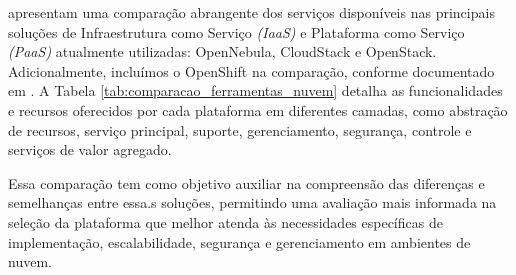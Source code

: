 \cite{vogel2016private} apresentam uma comparação abrangente dos serviços disponíveis nas principais soluções de Infraestrutura como Serviço \textit{(IaaS)} e Plataforma como Serviço \textit{(PaaS)} atualmente utilizadas: OpenNebula, CloudStack e OpenStack. Adicionalmente, incluímos o OpenShift na comparação, conforme documentado em \cite{OpenShiftDocumentation}. A Tabela \ref{tab:comparacao_ferramentas_nuvem} detalha as funcionalidades e recursos oferecidos por cada plataforma em diferentes camadas, como abstração de recursos, serviço principal, suporte, gerenciamento, segurança, controle e serviços de valor agregado.

Essa comparação tem como objetivo auxiliar na compreensão das diferenças e semelhanças entre essa.s soluções, permitindo uma avaliação mais informada na seleção da plataforma que melhor atenda às necessidades específicas de implementação, escalabilidade, segurança e gerenciamento em ambientes de nuvem.

\small %

